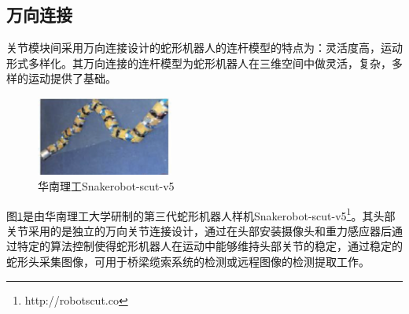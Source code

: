 \subsection{万向连接}
关节模块间采用万向连接设计的蛇形机器人的连杆模型的特点为：灵活度高，运动形式多样化。其万向连接的连杆模型为蛇形机器人在三维空间中做灵活，复杂，多样的运动提供了基础。
\begin{figure}
	\centering
	\includegraphics[width=0.4\textwidth]{figure/chap03/scut.eps}
	\caption{华南理工Snakerobot-scut-v5}
	\label{fig:scut}
\end{figure}图\ref{fig:scut}是由华南理工大学研制的第三代蛇形机器人样机Snakerobot-scut-v5\footnote{http://robotscut.co}。其头部关节采用的是独立的万向关节连接设计，通过在头部安装摄像头和重力感应器后通过特定的算法控制使得蛇形机器人在运动中能够维持头部关节的稳定，通过稳定的蛇形头采集图像，可用于桥梁缆索系统的检测或远程图像的检测提取工作。

